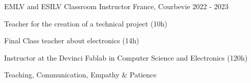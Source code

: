 \begin{cventries}
	\cventry
	{EMLV and ESILV} %
	{Classroom Instructor} %
	{France, Courbevie} %
	{2022 - 2023} %
	{
		\begin{cvitems} %
			\item {Teacher for the creation of a technical project (10h)}
			\item {Final Class teacher about electronics (14h)}
			\item {Instructor at the Devinci Fablab in Computer Science and Electronics (120h)}
		\end{cvitems}
	}
	{
		\begin{cvitemsskills} %
			\item {Teaching, Communication, Empathy \& Patience}
		\end{cvitemsskills}
	}

\end{cventries}
